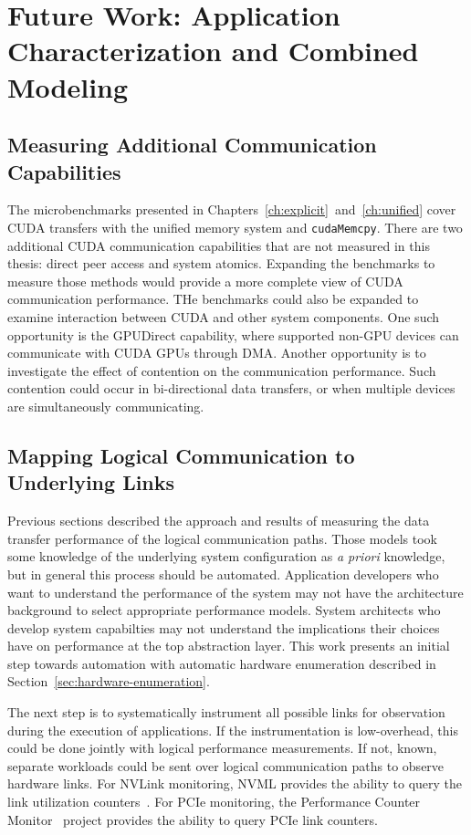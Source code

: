 \chapter{Future Work: Application Characterization and Combined Modeling}
\label{ch:future}

\section{Measuring Additional Communication Capabilities}

The microbenchmarks presented in Chapters~\ref{ch:explicit}~and~\ref{ch:unified} cover CUDA transfers with the unified memory system and \texttt{cudaMemcpy}.
There are two additional CUDA communication capabilities that are not measured in this thesis: direct peer access and system atomics.
Expanding the benchmarks to measure those methods would provide a more complete view of CUDA communication performance.
THe benchmarks could also be expanded to examine interaction between CUDA and other system components.
One such opportunity is the GPUDirect capability, where supported non-GPU devices can communicate with CUDA GPUs through DMA.
Another opportunity is to investigate the effect of contention on the communication performance.
Such contention could occur in bi-directional data transfers, or when multiple devices are simultaneously communicating.

\section{Mapping Logical Communication to Underlying Links}
\label{sec:map-underlying}

Previous sections described the approach and results of measuring the data transfer performance of the logical communication paths.
Those models took some knowledge of the underlying system configuration as \textit{a priori} knowledge, but in general this process should be automated.
Application developers who want to understand the performance of the system may not have the architecture background to select appropriate performance models.
System architects who develop system capabilties may not understand the implications their choices have on performance at the top abstraction layer.
This work presents an initial step towards automation with automatic hardware enumeration described in Section~\ref{sec:hardware-enumeration}.

The next step is to systematically instrument all possible links for observation during the execution of applications.
If the instrumentation is low-overhead, this could be done jointly with logical performance measurements.
If not, known, separate workloads could be sent over logical communication paths to observe hardware links.
For NVLink monitoring, NVML provides the ability to query the link utilization counters~\cite{nvidia2017nvmlreference}.
For PCIe monitoring, the Performance Counter Monitor~\cite{opcm2018pcm} project provides the ability to query PCIe link counters.

